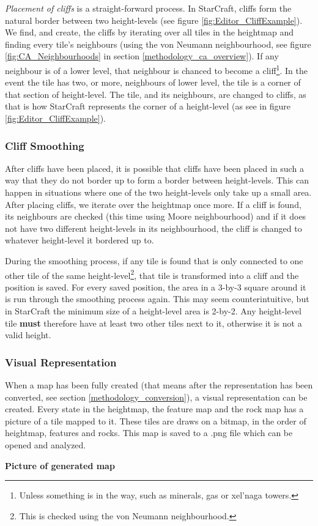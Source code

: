 \textit{Placement of cliffs} is a straight-forward process. In StarCraft, cliffs form the natural border between two height-levels (see figure \ref{fig:Editor_CliffExample}). We find, and create, the cliffs by iterating over all tiles in the heightmap and finding every tile's neighbours (using the von Neumann neighbourhood, see figure \ref{fig:CA_Neighbourhoods} in section \ref{methodology_ca_overview}). If any neighbour is of a lower level, that neighbour is chanced to become a cliff\footnote{Unless something is in the way, such as minerals, gas or xel'naga towers.}. In the event the tile has two, or more, neighbours of lower level, the tile is a corner of that section of height-level. The tile, and its neighbours, are changed to cliffs, as that is how StarCraft represents the corner of a height-level (as see in figure \ref{fig:Editor_CliffExample}).


\subsubsection{Cliff Smoothing}

After cliffs have been placed, it is possible that cliffs have been placed in such a way that they do not border up to form a border between height-levels. This can happen in situations where one of the two height-levels only take up a small area. After placing cliffs, we iterate over the heightmap once more. If a cliff is found, its neighbours are checked (this time using Moore neighbourhood) and if it does not have two different height-levels in its neighbourhood, the cliff is changed to whatever height-level it bordered up to. 

During the smoothing process, if any tile is found that is only connected to one other tile of the same height-level\footnote{This is checked using the von Neumann neighbourhood.}, that tile is transformed into a cliff and the position is saved. For every saved position, the area in a 3-by-3 square around it is run through the smoothing process again. This may seem counterintuitive, but in StarCraft the minimum size of a height-level area is 2-by-2. Any height-level tile \textbf{must} therefore have at least two other tiles next to it, otherwise it is not a valid height.

\subsubsection{Visual Representation}

When a map has been fully created (that means after the representation has been converted, see section \ref{methodology_conversion}), a visual representation can be created. Every state in the heightmap, the feature map and the rock map has a picture of a tile mapped to it. These tiles are draws on a bitmap, in the order of heightmap, features and rocks. This map is saved to a .png file which can be opened and analyzed.

\textbf{Picture of generated map}